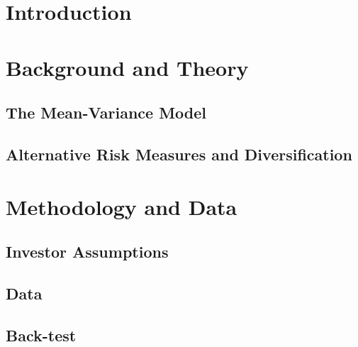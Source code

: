 \documentclass[12pt,a4paper]{article}
\begin{document}


\tableofcontents 

\newpage 



\section{Introduction}
\label{sec:Intro}

\citep{ACERBI20021505}

\section{Background and Theory}
\label{sec:Back}

\subsection{The Mean-Variance Model}
\label{subsec:MVmodel}

\subsection{Alternative Risk Measures and Diversification}
\label{subsec:ARMs}



\section{Methodology and Data}
\label{sec:Method}

\subsection{Investor Assumptions}
\label{subsec:InvAss}

\subsection{Data}
\label{subsec:Data}

\subsection{Back-test}
\label{subsec:BackTest}
\end{document}
